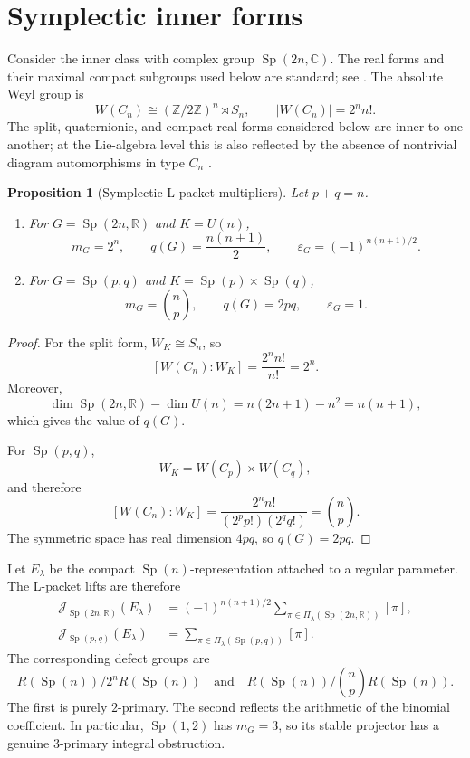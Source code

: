 \documentclass[11pt]{amsart}
\newtheorem{proposition}[theorem]{Proposition}
\theoremstyle{definition}
\theoremstyle{remark}
\newcommand{\R}{\mathbb R}
\newcommand{\C}{\mathbb C}
\newcommand{\Z}{\mathbb Z}
\newcommand{\Sp}{\operatorname{Sp}}
\begin{document}
\section{Symplectic inner forms}\label{sec:symplectic}

Consider the inner class with complex group $\Sp(2n,\C)$.  The real forms and their maximal compact subgroups used below are standard; see \cite[Chapter~X]{Helgason2001}.  The absolute Weyl group is
\[
  W(C_n)\cong(\Z/2\Z)^n\rtimes S_n,
  \qquad |W(C_n)|=2^n n!.
\]
The split, quaternionic, and compact real forms considered below are inner to one another; at the Lie-algebra level this is also reflected by the absence of nontrivial diagram automorphisms in type $C_n$ \cite[Chapter~X]{Helgason2001}.

\begin{proposition}[Symplectic L-packet multipliers]\label{prop:symplectic}
Let $p+q=n$.
\begin{enumerate}[label=\textup{(\roman*)}]
\item For $G=\Sp(2n,\R)$ and $K=U(n)$,
\begin{equation}\label{eq:split-data}
  m_G=2^n,
  \qquad
  q(G)=\frac{n(n+1)}2,
  \qquad
  \varepsilon_G=(-1)^{n(n+1)/2}.
\end{equation}
\item For $G=\Sp(p,q)$ and $K=\Sp(p)\times\Sp(q)$,
\begin{equation}\label{eq:quaternionic-data}
  m_G=\binom np,
  \qquad
  q(G)=2pq,
  \qquad
  \varepsilon_G=1.
\end{equation}
\end{enumerate}
\end{proposition}

\begin{proof}
For the split form, $W_K\cong S_n$, so
\[
  [W(C_n):W_K]=\frac{2^n n!}{n!}=2^n.
\]
Moreover,
\[
  \dim\Sp(2n,\R)-\dim U(n)
  =n(2n+1)-n^2=n(n+1),
\]
which gives the value of $q(G)$.

For $\Sp(p,q)$,
\[
  W_K=W(C_p)\times W(C_q),
\]
and therefore
\[
  [W(C_n):W_K]
  =\frac{2^n n!}{(2^pp!)(2^qq!)}
  =\binom np.
\]
The symmetric space has real dimension $4pq$, so $q(G)=2pq$.
\end{proof}

Let $E_\lambda$ be the compact $\Sp(n)$-representation attached to a regular parameter.  The L-packet lifts are therefore
\begin{align}
  \mathcal J_{\Sp(2n,\R)}(E_\lambda)
  &=(-1)^{n(n+1)/2}
    \sum_{\pi\in\Pi_\lambda(\Sp(2n,\R))}[\pi],
    \label{eq:split-packet}\\
  \mathcal J_{\Sp(p,q)}(E_\lambda)
  &=\sum_{\pi\in\Pi_\lambda(\Sp(p,q))}[\pi].
    \label{eq:quaternionic-packet}
\end{align}
The corresponding defect groups are
\begin{equation}\label{eq:symplectic-defects}
  R(\Sp(n))/2^nR(\Sp(n))
  \quad\text{and}\quad
  R(\Sp(n))/\binom np R(\Sp(n)).
\end{equation}
The first is purely $2$-primary.  The second reflects the arithmetic of the binomial coefficient.  In particular, $\Sp(1,2)$ has $m_G=3$, so its stable projector has a genuine $3$-primary integral obstruction.
\end{document}
